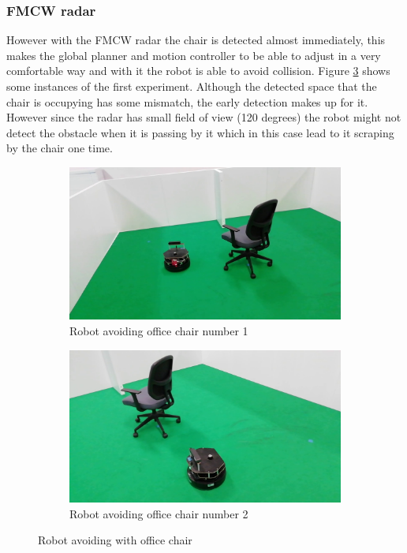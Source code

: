 \subsubsection*{\ac{FMCW} \ac{radar}}
However with the \ac{FMCW} radar the chair is detected almost immediately, this makes the global planner and motion controller to be able to adjust in a very comfortable way and with it the robot is able to avoid collision. Figure \ref{fig:wchairRS} shows some instances of the first experiment. Although the detected space that the chair is occupying has some mismatch, the early detection makes up for it. However since the radar has small field of view (120 degrees) the robot might not detect the obstacle when it is passing by it which in this case lead to it scraping by the chair one time.

\begin{figure}[h!]
  \centering
  \begin{subfigure}[b]{0.49\linewidth}
    \includegraphics[width=\linewidth]{imgs/chapter5/wchairRS.png}
     \caption{Robot avoiding office chair number 1}
     \label{fig::wchairRS1}
  \end{subfigure}
  \begin{subfigure}[b]{0.49\linewidth}
    \includegraphics[width=\linewidth]{imgs/chapter5/wchairRS2.png}
    \caption{Robot avoiding office chair number 2}
    \label{fig::wchairRS2}
  \end{subfigure}
  \caption{Robot avoiding with office chair}
  \label{fig:wchairRS}
\end{figure}

